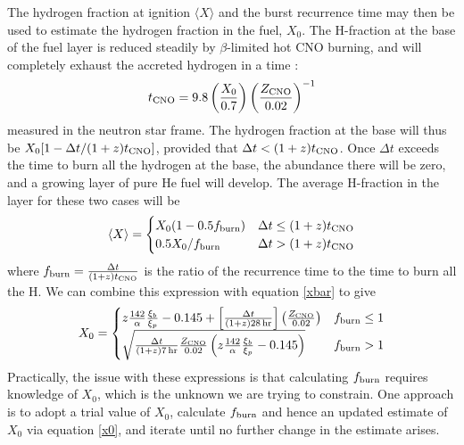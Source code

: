 \documentclass{aastex63}
\begin{document}
The hydrogen fraction at ignition $\langle X\rangle$ and the burst recurrence time may then be used to estimate the hydrogen fraction in the fuel, $X_0$. The H-fraction at the base of the fuel layer is reduced steadily by $\beta$-limited hot CNO burning, and will completely exhaust the accreted hydrogen in a time \cite[]{lampe16}:
\begin{equation}
t_{\rm CNO} =9.8\left(\frac{X_0}{0.7}\right) \left(\frac{Z_{\rm CNO}}{0.02}\right)^{-1}
\end{equation}
measured in the neutron star frame.
The hydrogen fraction at the base will thus be $X_0[1-\Delta t/(1+z)t_{\rm CNO}]$, 
%
provided that $\Delta t < (1+z)t_{\rm CNO}$. Once $\Delta t$ exceeds the time to burn all the hydrogen at the base, the abundance there will be zero, and a growing layer of pure He fuel will develop. The average H-fraction in the layer for these two cases will be 
\begin{equation}
\langle X \rangle = \begin{cases}
  X_0(1-0.5f_{\rm burn}) & \Delta t \leq (1+z)t_{\rm CNO} \\
  0.5X_0/f_{\rm burn} & \Delta t > (1+z)t_{\rm CNO}
  \end{cases}
\end{equation}
where $f_{\rm burn} = \frac{\Delta t}{(1+z)t_{\rm CNO}}$ is the ratio of the recurrence time to the time to burn all the H.
%
We can combine this expression with equation \ref{xbar} to give
\begin{equation}
X_0 = \begin{cases}
         z\frac{142}{\alpha}\frac{\xi_b}{\xi_p} - 0.145 
                           +\left[\frac{\Delta t}{(1+z)28\,{\rm hr}}\right]
                       \left(\frac{Z_{\rm CNO}}{0.02}\right) & f_{\rm burn} \leq 1\\
         \sqrt{ \frac{\Delta t}{(1+z)7\,{\rm hr}}\frac{Z_{\rm CNO}}{0.02}
                        \left(z\frac{142}{\alpha}\frac{\xi_b}{\xi_p} - 0.145\right) }
                        & f_{\rm burn} > 1
        \end{cases}
    \label{eq:X_0}
\end{equation}
Practically, the issue with these expressions is that calculating $f_{\rm burn}$ requires knowledge of $X_0$, which is the unknown we are trying to constrain. One approach is to adopt a trial value of $X_0$, calculate $f_{\rm burn}$ and hence an updated estimate of $X_0$ via equation \ref{x0}, and iterate until no further change in the estimate arises.
\end{document}
